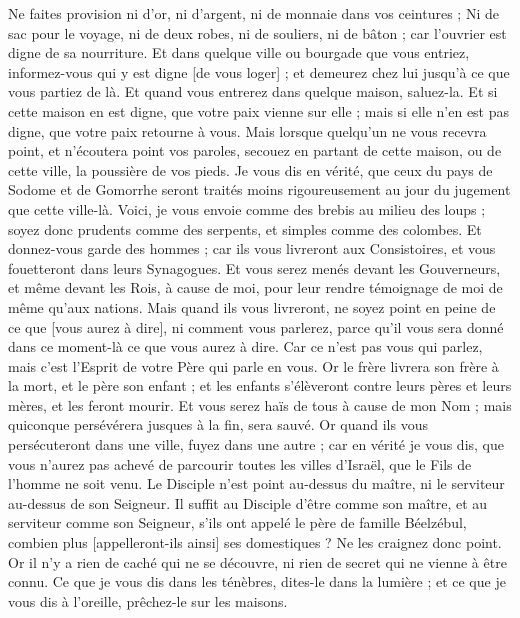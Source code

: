 \begin{multicols}{2}
Ne faites provision ni d'or, ni d'argent, ni de monnaie dans vos ceintures ;
Ni de sac pour le voyage, ni de deux robes, ni de souliers, ni de bâton ; car l'ouvrier est digne de sa nourriture.
Et dans quelque ville ou bourgade que vous entriez, informez-vous qui y est digne [de vous loger] ; et demeurez chez lui jusqu'à ce que vous partiez de là.
Et quand vous entrerez dans quelque maison, saluez-la.
Et si cette maison en est digne, que votre paix vienne sur elle ; mais si elle n'en est pas digne, que votre paix retourne à vous.
Mais lorsque quelqu'un ne vous recevra point, et n'écoutera point vos paroles, secouez en partant de cette maison, ou de cette ville, la poussière de vos pieds.
Je vous dis en vérité, que ceux du pays de Sodome et de Gomorrhe seront traités moins rigoureusement au jour du jugement que cette ville-là.
Voici, je vous envoie comme des brebis au milieu des loups ; soyez donc prudents comme des serpents, et simples comme des colombes.
Et donnez-vous garde des hommes ; car ils vous livreront aux Consistoires, et vous fouetteront dans leurs Synagogues.
Et vous serez menés devant les Gouverneurs, et même devant les Rois, à cause de moi, pour leur rendre témoignage de moi de même qu'aux nations.
Mais quand ils vous livreront, ne soyez point en peine de ce que [vous aurez à dire], ni comment vous parlerez, parce qu'il vous sera donné dans ce moment-là ce que vous aurez à dire.
Car ce n'est pas vous qui parlez, mais c'est l'Esprit de votre Père qui parle en vous.
Or le frère livrera son frère à la mort, et le père son enfant ; et les enfants s'élèveront contre leurs pères et leurs mères, et les feront mourir.
Et vous serez haïs de tous à cause de mon Nom ; mais quiconque persévérera jusques à la fin, sera sauvé.
Or quand ils vous persécuteront dans une ville, fuyez dans une autre ; car en vérité je vous dis, que vous n'aurez pas achevé de parcourir toutes les villes d'Israël, que le Fils de l'homme ne soit venu.
Le Disciple n'est point au-dessus du maître, ni le serviteur au-dessus de son Seigneur.
Il suffit au Disciple d'être comme son maître, et au serviteur comme son Seigneur, s'ils ont appelé le père de famille Béelzébul, combien plus [appelleront-ils ainsi] ses domestiques ?
Ne les craignez donc point. Or il n'y a rien de caché qui ne se découvre, ni rien de secret qui ne vienne à être connu.
Ce que je vous dis dans les ténèbres, dites-le dans la lumière ; et ce que je vous dis à l'oreille, prêchez-le sur les maisons.

\end{multicols}
